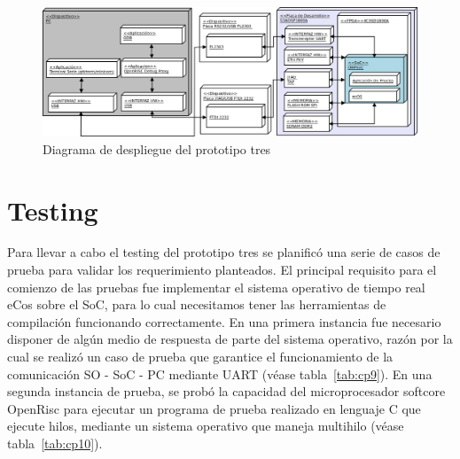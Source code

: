 		
	
		\begin{figure}[h!]
 		\begin{center}
  		\includegraphics[width=1.3\textwidth,keepaspectratio=true,angle=90]{./images/ecos}
  		\caption{Diagrama de despliegue del prototipo tres}
  		\label{fig:ecos} 
 		\end{center}
		\end{figure}
	
		
		
\newpage
		\section{Testing}

Para llevar a cabo el testing del prototipo tres se planificó una serie de casos de prueba para validar los requerimiento planteados.
El principal requisito para el comienzo de las pruebas fue implementar el sistema operativo de tiempo real eCos sobre el SoC, para lo cual necesitamos tener las herramientas de compilación funcionando correctamente. En una primera
instancia fue necesario disponer de algún medio de respuesta de parte del sistema operativo, razón por la cual se realizó un caso de prueba que garantice el funcionamiento  de la comunicación SO - SoC - PC mediante UART (véase tabla~\ref{tab:cp9}). En una segunda instancia de prueba, se probó la capacidad del microprocesador softcore OpenRisc para ejecutar un programa de prueba realizado en lenguaje C que ejecute hilos, mediante un sistema operativo que maneja multihilo (véase tabla~\ref{tab:cp10}).

